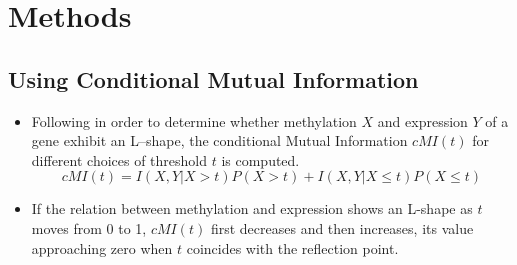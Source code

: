 \section{Methods}
\subsection{Using Conditional Mutual Information}
\begin{itemize}
\item Following \cite{Liu} in order to determine whether methylation $X$ and expression $Y$ of a gene exhibit an L--shape, the conditional Mutual Information $cMI(t)$ for different choices of threshold $t$ is computed.
\[
\mathit{cMI}(t)=I(X,Y|X>t)P(X>t) + I(X,Y|X\le t)P(X\le t)
\]
\item If the relation between methylation and expression shows an L-shape  as $t$ moves from 0 to 1, $\mathit{cMI}(t)$ first decreases and then increases, its value approaching zero when $t$ coincides with the reflection point. 
\end{itemize}
